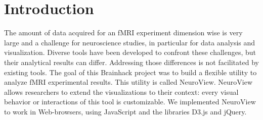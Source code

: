 \documentclass[twocolumn]{bmcart}%
\begin{document}
\begin{frontmatter}
\begin{fmbox}

	








%
\end{fmbox}%

\end{frontmatter}


\section{Introduction}\label{introduction}

The amount of data acquired for an fMRI experiment dimension wise is
very large and a challenge for neuroscience studies, in particular for
data analysis and visualization. Diverse tools have been developed to
confront these challenges, but their analytical results can differ.
Addressing those differences is not facilitated by existing tools. The
goal of this Brainhack project was to build a flexible utility to
analyze fMRI experimental results. This utility is called NeuroView.
NeuroView allows researchers to extend the visualizations to their
context: every visual behavior or interactions of this tool is
customizable. We implemented NeuroView to work in Web-browsers, using
JavaScript and the libraries D3.js and jQuery.
\end{document}
